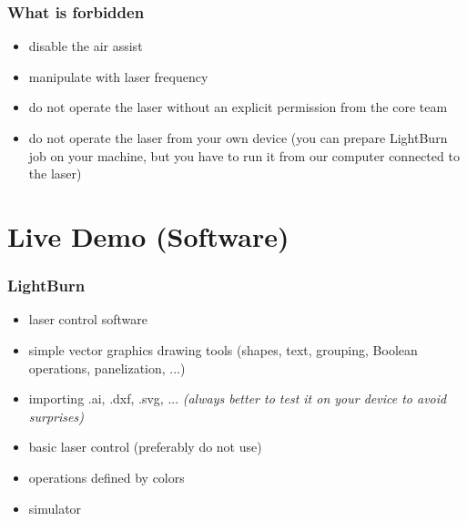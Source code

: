 \documentclass[14pt]{beamer}
\begin{document}
\begin{frame}
\frametitle{What is forbidden}

\begin{itemize}
	\item disable the air assist
	\item manipulate with laser frequency
	\item do not operate the laser without an explicit permission from the core team
	\item do not operate the laser from your own device (you can prepare LightBurn job on your machine, but you have to run it from our computer connected to the laser)
\end{itemize}


\end{frame}



\section{Live Demo (Software)}

\begin{frame}
\frametitle{LightBurn}

\begin{itemize}
	\item laser control software
	\item simple vector graphics drawing tools (shapes, text, grouping, Boolean operations, panelization, ...)
	\item importing .ai, .dxf, .svg, ... \textit{(always better to test it on your device to avoid surprises)}
	\item basic laser control (preferably do not use)
	\item operations defined by colors
	\item simulator
\end{itemize}


\end{frame}
\end{document}

